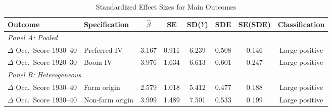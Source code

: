 \begin{table}[H]
\centering
\caption{Standardized Effect Sizes for Main Outcomes}
\label{tab:sde}
\begin{threeparttable}
\begin{adjustbox}{max width=\textwidth}
\footnotesize
\begin{tabular}{llcccccc}
\toprule
Outcome & Specification & $\hat{\beta}$ & SE & SD($Y$) & SDE & SE(SDE) & Classification \\
\midrule
\multicolumn{8}{l}{\textit{Panel A: Pooled}} \\
$\Delta$ Occ.\ Score 1930--40 & Preferred IV & 3.167 & 0.911 & 6.239 & 0.508 & 0.146 & Large positive \\
$\Delta$ Occ.\ Score 1920--30 & Boom IV & 3.976 & 1.634 & 6.613 & 0.601 & 0.247 & Large positive \\
\midrule
\multicolumn{8}{l}{\textit{Panel B: Heterogeneous}} \\
$\Delta$ Occ.\ Score 1930--40 & Farm origin & 2.579 & 1.018 & 5.412 & 0.477 & 0.188 & Large positive \\
$\Delta$ Occ.\ Score 1930--40 & Non-farm origin & 3.999 & 1.489 & 7.501 & 0.533 & 0.199 & Large positive \\
\bottomrule
\end{tabular}
\end{adjustbox}
\begin{tablenotes}[flushleft]
\small

\end{tablenotes}
\end{threeparttable}
\end{table}
